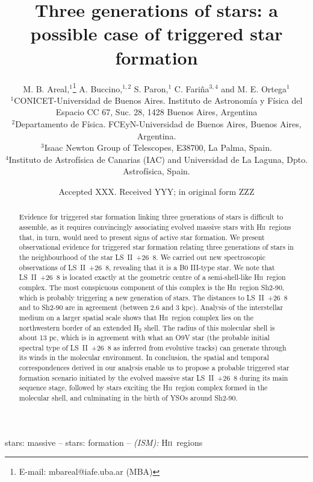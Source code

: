 \documentclass[fleqn,usenatbib]{mnras}
\title[Linking three generations of stars]{Three generations of stars: a possible case of triggered star formation}
\author[M. B. Areal et al.]{
M. B. Areal,$^{1}$\thanks{E-mail: mbareal@iafe.uba.ar (MBA)}
A. Buccino,$^{1,2}$
S. Paron,$^{1}$
C. Fari\~{n}a$^{3,4}$
and M. E. Ortega$^{1}$
\\
$^{1}$CONICET-Universidad de Buenos Aires. Instituto de Astronom\'ia y F\'isica del Espacio CC 67, Suc. 28, 1428 Buenos Aires, Argentina\\
$^{2}$Departamento de F\'isica. FCEyN-Universidad de Buenos Aires, Buenos Aires, Argentina.\\
$^{3}$Isaac Newton Group of Telescopes, E38700, La Palma, Spain.\\
$^{4}$Instituto de Astrof\'isica de Canarias (IAC) and Universidad de La Laguna, Dpto. Astrof\'isica, Spain.
}
\date{Accepted XXX. Received YYY; in original form ZZZ}
\def\hii{H\textsc{ii}}
\begin{document}
\label{firstpage}
\pagerange{\pageref{firstpage}--\pageref{lastpage}}
\maketitle

\begin{abstract}

Evidence for triggered star formation linking three generations of stars is 
difficult to assemble, as it requires convincingly associating evolved massive stars 
with \hii~regions that, in turn, would need to present signs of active star formation. 
We present observational evidence for triggered star formation relating three generations 
of stars in the neighbourhood of the star LS~II~+26~8. We carried out new spectroscopic 
observations of LS~II~+26~8, revealing that it is a \textsc{B0 III}-type star.
We note that LS~II~+26~8 is located exactly at the geometric centre of a semi-shell-like 
\hii~region complex. The most conspicuous component of this complex is the \hii~region 
Sh2-90, which is probably triggering a new generation of stars. The distances to LS~II~+26~8 and to Sh2-90 
are in agreement (between 2.6 and 3 kpc). Analysis of the 
interstellar medium on a larger spatial scale shows that \hii~region complex lies on
the northwestern border of an extended H$_{2}$ shell. The radius of this molecular 
shell is about 13 pc, which is in agreement with what an O9V star (the probable initial 
spectral type of LS~II~+26~8 as inferred from evolutive tracks) can generate through its 
winds in the molecular environment. In conclusion, the spatial and temporal 
correspondences derived in our analysis enable us to propose a probable triggered star 
formation scenario initiated by the evolved massive star LS~II~+26~8 during its main sequence 
stage, followed by stars exciting the \hii~region complex formed in the molecular 
shell, and culminating in the birth of YSOs around Sh2-90. 



\end{abstract}

\begin{keywords}
stars: massive -- stars: formation -- {\it (ISM):} \hii~regions
\end{keywords}


\end{document}

